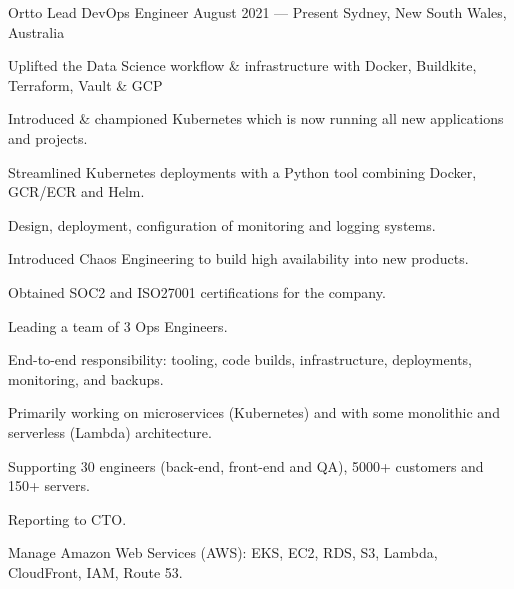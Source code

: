 
\begin{experiences}

  \expitem
  {Ortto} %
  {Lead DevOps Engineer} %
  {August 2021 --- Present} %
  {Sydney, New South Wales, Australia} %
  {
    \begin{cvitems}
      \item {Uplifted the Data Science workflow \& infrastructure with Docker, Buildkite, Terraform, Vault \& GCP}
      \item {Introduced \& championed Kubernetes which is now running all new applications and projects.}
      \item {Streamlined Kubernetes deployments with a Python tool combining Docker, GCR/ECR and Helm.}
      \item {Design, deployment, configuration of monitoring and logging systems.}
      \item {Introduced Chaos Engineering to build high availability into new products.}
      \item {Obtained SOC2 and ISO27001 certifications for the company.}
    \end{cvitems}
  }
  {
    \begin{cvitems}
      \item {Leading a team of 3 Ops Engineers.}
      \item {End-to-end responsibility: tooling, code builds, infrastructure, deployments, monitoring, and backups.}
      \item {Primarily working on microservices (Kubernetes) and with some monolithic and serverless (Lambda) architecture.}
      \item {Supporting 30 engineers (back-end, front-end and QA), 5000+ customers and 150+ servers.}
      \item {Reporting to CTO.}
    \end{cvitems}
  }
  {
    \begin{cvitems}
      \item {Manage Amazon Web Services (AWS): EKS, EC2, RDS, S3, Lambda, CloudFront, IAM, Route 53.}

\end{cvitems}}
\end{experiences}
